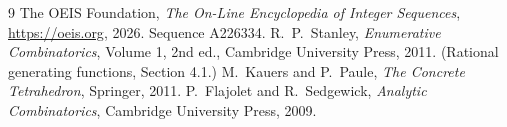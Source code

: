 \documentclass[11pt,a4paper]{article}
\theoremstyle{plain}
\theoremstyle{definition}
\begin{document}
\begin{thebibliography}{9}
 The OEIS Foundation, \emph{The On-Line Encyclopedia of Integer
Sequences}, \url{https://oeis.org}, 2026. Sequence A226334.
 R.~P.~Stanley, \emph{Enumerative Combinatorics}, Volume 1, 2nd ed.,
Cambridge University Press, 2011. (Rational generating functions, Section 4.1.)
 M.~Kauers and P.~Paule, \emph{The Concrete Tetrahedron}, Springer, 2011.
 P.~Flajolet and R.~Sedgewick, \emph{Analytic Combinatorics}, Cambridge
University Press, 2009.
\end{thebibliography}
\end{document}
